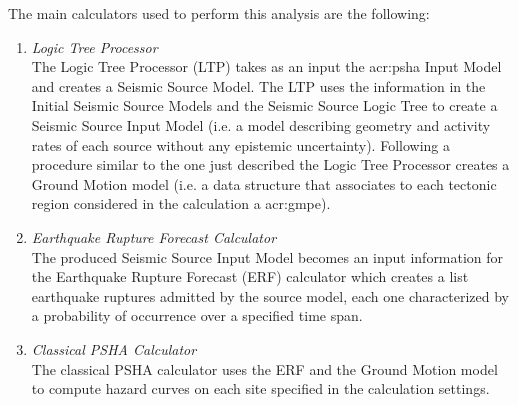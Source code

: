 The main calculators used to perform this analysis are the following:
\begin{enumerate}
\item \emph{Logic Tree Processor} \hfill \\
The Logic Tree Processor (LTP) takes as an input the \gls{acr:psha} 
Input Model and creates a Seismic Source Model. The LTP uses the 
information in the Initial Seismic Source Models and 
the Seismic Source Logic Tree to create a Seismic Source Input
Model (i.e. a model describing geometry and activity rates of each 
source without any epistemic uncertainty).
%
Following a procedure similar to the one just described the Logic Tree 
Processor creates a Ground Motion model (i.e. a data structure that 
associates to each tectonic region considered in the calculation a 
\gls{acr:gmpe}).
%
\item \emph{Earthquake Rupture Forecast Calculator} \hfill \\
The produced Seismic Source Input Model becomes an input information for 
the Earthquake Rupture Forecast (ERF) calculator which creates a list 
earthquake ruptures admitted by the source model, each one characterized
by a probability of occurrence over a specified time span.
\item \emph{Classical PSHA Calculator} \hfill \\
The classical PSHA calculator uses the ERF and the Ground Motion model 
to compute hazard curves on each site specified in the calculation settings.
\end{enumerate} 
%
